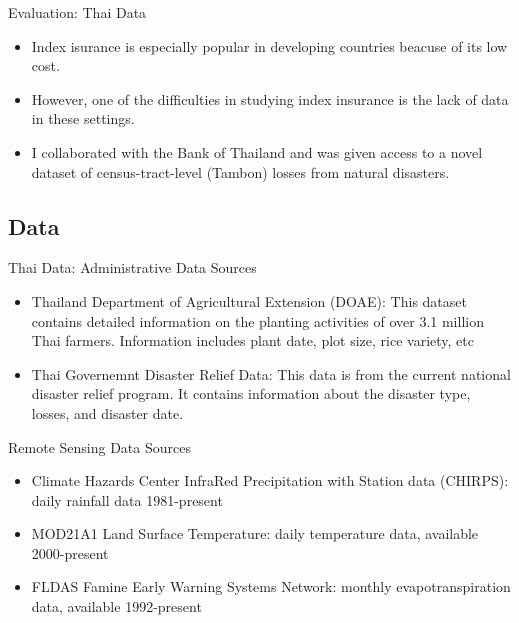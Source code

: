 \documentclass{beamer}
\begin{document}
\begin{frame}{Evaluation: Thai Data}
    \begin{itemize}
        \setlength \itemsep{2em}
        \item Index isurance is especially popular in developing countries beacuse of its low cost.
        \item However, one of the difficulties in studying index insurance is the lack of data in these settings. 
        \item I collaborated with the Bank of Thailand and was given access to a novel dataset of census-tract-level (Tambon) losses from natural disasters.
    \end{itemize}
    
\end{frame}
\subsection{Data}
\begin{frame}{Thai Data: Administrative Data Sources}
    \begin{itemize}
        \setlength\itemsep{2em}
        \item Thailand Department of Agricultural Extension (DOAE): This dataset contains detailed information on the planting activities of over 3.1 million Thai farmers. Information includes plant date, plot size, rice variety, etc
        \item Thai Governemnt Disaster Relief Data: This data is from the current national disaster relief program. It contains information about the disaster type, losses, and disaster date.  
    \end{itemize}
\end{frame}

\begin{frame}{Remote Sensing Data Sources}
    \begin{itemize}
        \setlength\itemsep{2em}
        \item Climate Hazards Center InfraRed Precipitation with Station data (CHIRPS): daily rainfall data 1981-present
        \item MOD21A1 Land Surface Temperature: daily temperature data, available 2000-present 
        \item FLDAS Famine Early Warning Systems Network: monthly evapotranspiration data, available 1992-present
    \end{itemize}
\end{frame}
\end{document}
